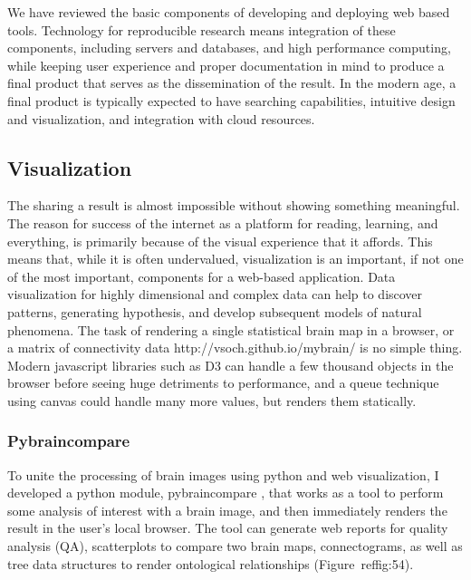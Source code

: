 \documentclass{report}
\begin{document}
We have reviewed the basic components of developing and deploying web
based tools. Technology for reproducible research means integration of
these components, including servers and databases, and high performance
computing, while keeping user experience and proper documentation in
mind to produce a final product that serves as the dissemination of the
result. In the modern age, a final product is typically expected to have
searching capabilities, intuitive design and visualization, and
integration with cloud resources.

\subsection{Visualization}

The sharing a result is almost impossible without showing something
meaningful. The reason for success of the internet as a platform for
reading, learning, and everything, is primarily because of the visual
experience that it affords. This means that, while it is often
undervalued, visualization is an important, if not one of the most
important, components for a web-based application. Data visualization
for highly dimensional and complex data can help to discover patterns,
generating hypothesis, and develop subsequent models of natural
phenomena. The task of rendering a single statistical brain map in a
browser, or a matrix of connectivity data \cite{http://vsoch.github.io/mybrain/}{http://vsoch.github.io/mybrain/} is no simple thing. Modern javascript libraries such as D3 \cite{Bostock2011-ei} can
handle a few thousand objects in the browser before seeing huge
detriments to performance, and a queue technique using canvas \cite{noauthor_undated-hy} could
handle many more values, but renders them statically.

\subsubsection{Pybraincompare}

To unite the processing of brain images using python and web
visualization, I developed a python module, pybraincompare \cite{noauthor_undated-hu},
that works as a tool to perform some analysis of interest with a brain
image, and then immediately renders the result in the user's local
browser. The tool can generate web reports for quality analysis (QA),
scatterplots to compare two brain maps, connectograms, as well as tree
data structures to render ontological relationships (Figure~ref{fig:54}).
\end{document}
